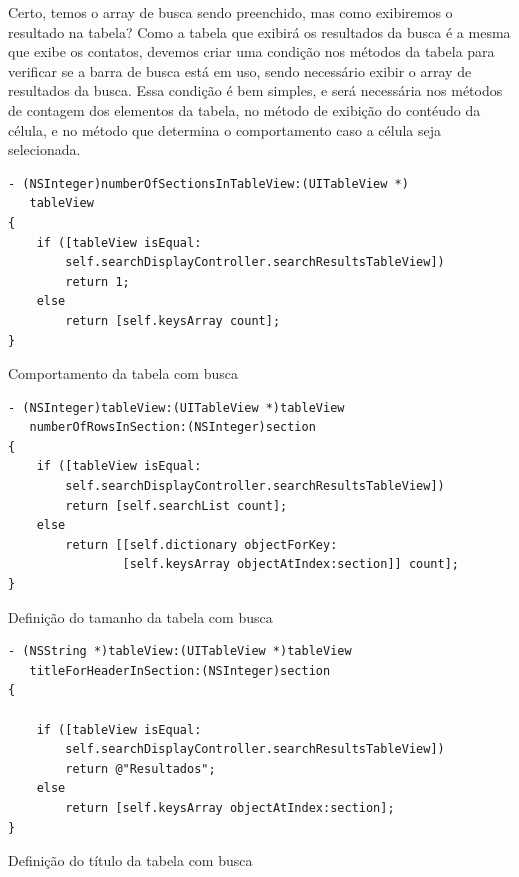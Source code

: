 \documentclass[a4paper,12pt,brazil,doubleside]{book}
\begin{document}
\begin{singlespace}
Certo, temos o array de busca sendo preenchido, mas como exibiremos o resultado na tabela? Como a tabela que exibirá os resultados da busca é a mesma que exibe os contatos, devemos criar uma condição nos métodos da tabela para verificar se a barra de busca está em uso, sendo necessário exibir o array de resultados da busca. Essa condição é bem simples, e será necessária nos métodos de contagem dos elementos da tabela, no método de exibição do contéudo da célula, e no método que determina o comportamento caso a célula seja selecionada.

\begin{listing}[H]
\begin{verbatim}
- (NSInteger)numberOfSectionsInTableView:(UITableView *)
   tableView
{
    if ([tableView isEqual:
        self.searchDisplayController.searchResultsTableView])
        return 1;
    else
        return [self.keysArray count];
}
\end{verbatim}
\caption{Comportamento da tabela com busca}
\end{listing}

\bigskip

\begin{listing}[H]
\begin{verbatim}
- (NSInteger)tableView:(UITableView *)tableView
   numberOfRowsInSection:(NSInteger)section
{
    if ([tableView isEqual:
        self.searchDisplayController.searchResultsTableView])
        return [self.searchList count];
    else
        return [[self.dictionary objectForKey:
                [self.keysArray objectAtIndex:section]] count];
}
\end{verbatim}
\caption{Definição do tamanho da tabela com busca}
\end{listing}

\bigskip

\begin{listing}[H]
\begin{verbatim}
- (NSString *)tableView:(UITableView *)tableView
   titleForHeaderInSection:(NSInteger)section
{
    
    if ([tableView isEqual:
        self.searchDisplayController.searchResultsTableView])
        return @"Resultados";
    else
        return [self.keysArray objectAtIndex:section];
}
\end{verbatim}
\caption{Definição do título da tabela com busca}
\end{listing}



\end{singlespace}
\end{document}
